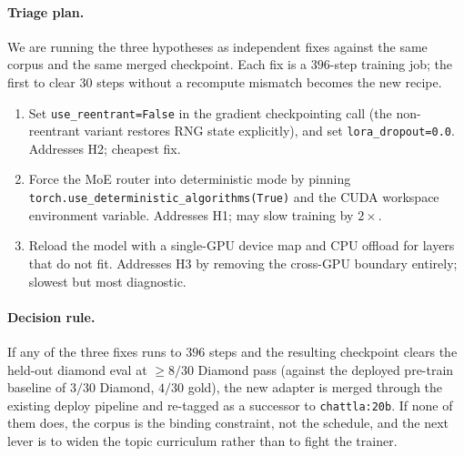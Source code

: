 \documentclass[11pt]{article}
\begin{document}
\paragraph{Triage plan.} We are running the three hypotheses as
independent fixes against the same corpus and the same merged
checkpoint. Each fix is a $396$-step training job; the first to clear
$30$ steps without a recompute mismatch becomes the new recipe.
\begin{enumerate}[leftmargin=1.4em, itemsep=2pt]
\item Set \texttt{use\_reentrant=False} in the gradient checkpointing
  call (the non-reentrant variant restores RNG state explicitly), and
  set \texttt{lora\_dropout=0.0}. Addresses H2; cheapest fix.
\item Force the MoE router into deterministic mode by pinning
  \texttt{torch.use\_deterministic\_algorithms(True)} and the CUDA
  workspace environment variable. Addresses H1; may slow training by
  $2\!\times$.
\item Reload the model with a single-GPU device map and CPU offload
  for layers that do not fit. Addresses H3 by removing the cross-GPU
  boundary entirely; slowest but most diagnostic.
\end{enumerate}

\paragraph{Decision rule.} If any of the three fixes runs to $396$
steps and the resulting checkpoint clears the held-out diamond eval
at $\ge\!8/30$ Diamond pass (against the deployed pre-train baseline
of $3/30$ Diamond, $4/30$ gold), the new adapter is merged through
the existing deploy pipeline and re-tagged as a successor to
\texttt{chattla:20b}. If none of them does, the corpus is the binding
constraint, not the schedule, and the next lever is to widen the
topic curriculum rather than to fight the trainer.
\end{document}
